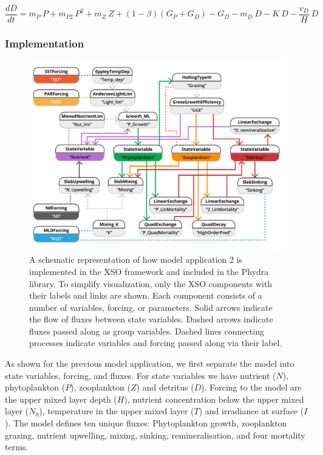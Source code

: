 \documentclass[journal abbreviation, manuscript]{copernicus}
\begin{document}
\begin{equation}
    \frac{d D}{d t} = 
    m_P \ P %
    + m_{P2} \ P^2 %
    + m_Z \ Z %
    + (1 - \beta)(G_P + G_D) %
    - G_D %
    - m_D \ D %
    - K \ D %
    - \frac{v_D}{H} \ D %
\end{equation}


\subsubsection{Implementation}

\begin{figure}[t]
\includegraphics[width=15cm]{Figures/firstdraft_schematics/code_schematics/EMPOWER.pdf}
\caption{A schematic representation of how model application 2 is implemented in the XSO framework and included in the Phydra library. To simplify visualization, only the XSO components with their labels and links are shown. Each component consists of a number of variables, forcing, or parameters. Solid arrows indicate the flow of fluxes between state variables. Dashed arrows indicate fluxes passed along as group variables. Dashed lines connecting processes indicate variables and forcing passed along via their label.}
\label{Figure:CodeSchematics_2}
\end{figure}

As shown for the previous model application, we first separate the model into state variables, forcing, and fluxes. For state variables we have nutrient ($N$), phytoplankton ($P$), zooplankton ($Z$) and detritus ($D$). Forcing to the model are the upper mixed layer depth ($H$), nutrient concentration below the upper mixed layer ($N_0$), temperature in the upper mixed layer ($T$) and irradiance at surface ($I$). The model defines ten unique fluxes: Phytoplankton growth, zooplankton grazing, nutrient upwelling, mixing, sinking, remineralisation, and four mortality terms.
\end{document}
